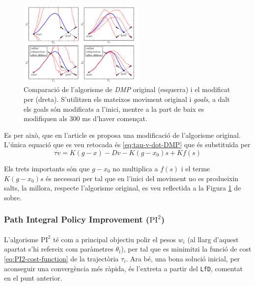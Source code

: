 \documentclass[12pt,a4paper,final,twoside]{article}
\begin{document}
\begin{figure}
\centering
\includegraphics[width=0.55\textwidth]{Imatges/DMP-modified-algorism}
\caption[Comparació de l'algorisme de \textit{DMP} original (esquerra) i el modificat  per \cite{Pastor2009} (dreta)]{Comparació de l'algorisme de \textit{DMP} original (esquerra) i el modificat  per \cite{Pastor2009} (dreta). S'utilitzen els mateixos moviment original i \textit{goals}, a dalt els goals són modificats a l'inici, mentre a la part de baix es modifiquen als 300 ms d'haver començat.}
\label{fig:DMP-modified-algorism}
\end{figure}

Es per això, que en l'article \cite{Pastor2009} es proposa una modificació de l'algorisme original. L'única equació que es veu retocada és \eqref{eq:tau-v-dot-DMP} que és substituïda per
\begin{equation}\label{eq:tau-v-dot-DMP-modified}
\tau \dot{v} = K(g - x) - Dv - K(g - x_0)s + K f(s)
\end{equation}

Els trets importants són que $g - x_0$ no multiplica a $f(s)$ i el terme $K(g - x_0)s$ és necessari per tal que en l'inici del moviment no es produeixin salts, la millora, respecte l'algorisme original, es veu reflectida a la Figura \ref{fig:DMP-modified-algorism} de sobre.


\subsubsection{\textbf{P}ath \textbf{I}ntegral \textbf{P}olicy \textbf{I}mprovement ($\mathrm{PI^2}$)}
\label{PI2-estat-de-l'art}

\paragraph{}L'algorisme $\mathrm{PI^2}$ \cite{Stulp2011} té com a principal objectiu polir el pesos $w_i$ (al llarg d'aquest apartat s'hi refereix com paràmetres $\theta_t$), per tal que es minimitzi la funció de cost \eqref{eq:PI2-cost-function} de la trajectòria $\tau_i$. Ara bé, una bona solució inicial, per aconseguir una convergència més ràpida, és l'extreta a partir del \texttt{LfD}, comentat en el punt anterior.
\end{document}

